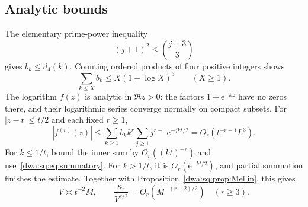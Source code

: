 \documentclass[11pt,letterpaper]{article}
\numberwithin{equation}{section}
\theoremstyle{remark}
\newcommand{\e}{\mathrm e}
\begin{document}
\subsection{Analytic bounds}
The elementary prime-power inequality
\[
 (j+1)^2\le\binom{j+3}{3}
\]
gives $b_k\le d_4(k)$. Counting ordered products of four positive integers shows
\begin{equation}\label{dwa:sq:eq:summatory}
 \sum_{k\le X}b_k\le X(1+\log X)^3\qquad(X\ge1).
\end{equation}
The logarithm $f(z)$ is analytic in $\Re z>0$: the factors $1+\e^{-kz}$ have no zeros there, and their logarithmic series converge normally on compact subsets. For $|z-t|\le t/2$ and each fixed $r\ge1$,
\begin{equation}\label{dwa:sq:eq:analytic}
 |f^{(r)}(z)|\le\sum_{k\ge1}b_kk^r\sum_{j\ge1}j^{r-1}\e^{-jkt/2}
 =O_r(t^{-r-1}L^3).
\end{equation}
For $k\le1/t$, bound the inner sum by $O_r((kt)^{-r})$ and use~\eqref{dwa:sq:eq:summatory}. For $k>1/t$, it is $O_r(\e^{-kt/2})$, and partial summation finishes the estimate. Together with Proposition~\ref{dwa:sq:prop:Mellin}, this gives
\begin{equation}\label{dwa:sq:eq:normalized}
 V\asymp t^{-2}M,\qquad
 \frac{\kappa_r}{V^{r/2}}=O_r(M^{-(r-2)/2})\quad(r\ge3).
\end{equation}
\end{document}
